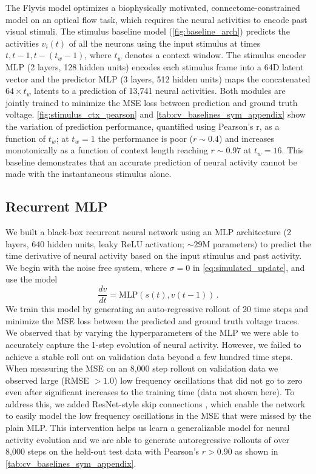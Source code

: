 \documentclass{article}
\def\mlpbase{Recurrent MLP}
\begin{document}
The Flyvis model optimizes a biophysically motivated, connectome-constrained model on an optical flow task, which requires the neural activities to encode past visual stimuli. The stimulus baseline model  (\cref{fig:baseline_arch}) predicts the activities $v_i(t)$ of all the neurons using the input stimulus at times $t, t-1, t-(t_w-1)$, where $t_w$ denotes a context window. The stimulus encoder MLP (2 layers, 128 hidden units) encodes each stimulus frame into a 64D latent vector and the predictor MLP (3 layers, 512 hidden units) maps the concatenated $64\times t_w$ latents to a prediction of 13{,}741 neural activities. Both modules are jointly trained to minimize the MSE loss between prediction and ground truth voltage. \cref{fig:stimulus_ctx_pearson} and \cref{tab:cv_baselines_sym_appendix} show the variation of prediction performance, quantified using Pearson's r, as a function of $t_w$; at $t_w=1$ the performance is poor ($r \sim 0.4$) and increases monotonically as a function of context length
reaching $r \sim  0.97$ at $t_w=16$. This baseline demonstrates that an accurate prediction of neural activity cannot be made with the instantaneous stimulus alone.


\subsection{\mlpbase}

We built a black-box recurrent neural network using an MLP architecture (2 layers, 640 hidden units, leaky ReLU activation; $\sim 29$M parameters) to predict the time derivative of neural activity based on the input stimulus and past activity. We begin with the noise free system, where $\sigma = 0$ in \cref{eq:simulated_update}, and use the model
\begin{equation}
    \frac{dv}{dt} = \mathrm{MLP}(s(t), v(t-1))\, .
    \label{eq:mlp_update}
\end{equation}
We train this model by generating an auto-regressive rollout of 20 time steps and minimize the MSE loss between the predicted and ground truth voltage traces. We observed that by varying the hyperparameters of the MLP we were able to accurately capture the 1-step evolution of neural activity. However, we failed to achieve a stable roll out on validation data beyond a few hundred time steps. When measuring the MSE on an 8{,}000 step rollout on validation data we observed large (RMSE $> 1.0$) low frequency oscillations that did not go to zero even after significant increases to the training time (data not shown here). To address this, we added ResNet-style skip connections \citep{he_deep_2015}, which enable the network to easily model the low frequency oscillations in the MSE that were missed by the plain MLP. This intervention helps us learn a generalizable model for neural activity evolution and we are able to generate autoregressive rollouts of over 8{,}000 steps on the held-out test data with Pearson's $r > 0.90$ as shown in \cref{tab:cv_baselines_sym_appendix}.
\end{document}
